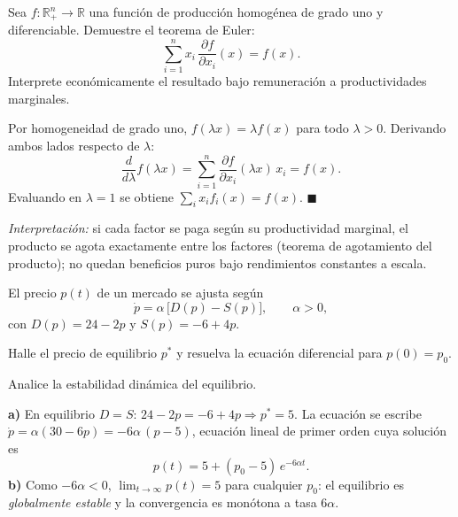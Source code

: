 \documentclass{evaluacion}
\begin{document}
\begin{pregunta}[5][Demostración]
Sea $f\colon\mathbb{R}^{n}_{+}\to\mathbb{R}$ una función de producción
homogénea de grado uno y diferenciable. Demuestre el teorema de Euler:
\[
  \sum_{i=1}^{n} x_i\,\frac{\partial f}{\partial x_i}(x) = f(x).
\]
Interprete económicamente el resultado bajo remuneración a productividades
marginales.
\espaciorespuesta{7cm}
\begin{solucion}
Por homogeneidad de grado uno, $f(\lambda x)=\lambda f(x)$ para todo
$\lambda>0$. Derivando ambos lados respecto de $\lambda$:
\[
  \frac{d}{d\lambda} f(\lambda x)
  = \sum_{i=1}^{n} \frac{\partial f}{\partial x_i}(\lambda x)\,x_i
  = f(x).
\]
Evaluando en $\lambda = 1$ se obtiene
$\sum_i x_i f_i(x) = f(x)$. \hfill$\blacksquare$

\emph{Interpretación:} si cada factor se paga según su productividad
marginal, el producto se agota exactamente entre los factores
(teorema de agotamiento del producto); no quedan beneficios puros bajo
rendimientos constantes a escala.
\end{solucion}
\end{pregunta}

\begin{pregunta}
El precio $p(t)$ de un mercado se ajusta según
\[
  \dot{p} = \alpha\,\bigl[D(p) - S(p)\bigr], \qquad \alpha > 0,
\]
con $D(p) = 24 - 2p$ y $S(p) = -6 + 4p$.
\begin{apartados}
  \item Halle el precio de equilibrio $p^{*}$ y resuelva la ecuación
        diferencial para $p(0)=p_0$. 
  \item Analice la estabilidad dinámica del equilibrio. 
\end{apartados}
\espaciorespuesta{7cm}
\begin{solucion}
\textbf{a)} En equilibrio $D=S$: $24-2p = -6+4p \Rightarrow p^{*}=5$.
La ecuación se escribe $\dot p = \alpha(30 - 6p) = -6\alpha\,(p-5)$,
ecuación lineal de primer orden cuya solución es
\[
  p(t) = 5 + (p_0 - 5)\,e^{-6\alpha t}.
\]
\textbf{b)} Como $-6\alpha<0$, $\lim_{t\to\infty}p(t)=5$ para cualquier
$p_0$: el equilibrio es \emph{globalmente estable} y la convergencia es
monótona a tasa $6\alpha$.
\end{solucion}
\end{pregunta}
\end{document}
